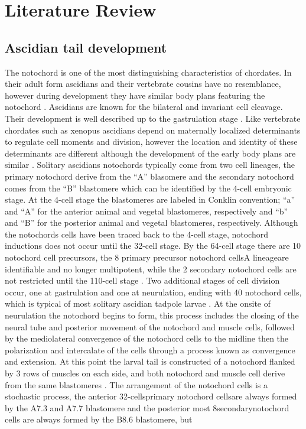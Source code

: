 \chapter{Literature Review}
\section{Ascidian tail development}

The notochord is one of the most distinguishing characteristics of chordates. In their adult form ascidians and their vertebrate cousins have no resemblance, however during development they have similar body plans featuring the notochord \cite{jeffery_minireview_2002}. Ascidians are known for the bilateral and invariant cell cleavage. Their development is well described up to the gastrulation stage \cite{nishida_cell_1983,nishida_cell_1985,nishida_cell_1987}. Like vertebrate chordates such as xenopus ascidians depend on maternally localized determinants to regulate cell moments and division, however the location and identity of these determinants are different although the development of the early body plans are similar \cite{lemaire_ascidians_2008}. Solitary ascidians notochords typically come from two cell lineages, the primary notochord derive from the ``A'' blasomere and the secondary notochord comes from the ``B'' blastomere \cite{nishida_cell_1983} which can be identified by the 4-cell embryonic stage. At the 4-cell stage the blastomeres are labeled in Conklin \cite{conklin_organization_1905} convention; ``a'' and ``A'' for the anterior animal and vegetal blastomeres, respectively and ``b'' and ``B'' for the posterior animal and vegetal blastomeres, respectively. Although the notochords cells have been traced back to the 4-cell stage, notochord inductions does not occur until the 32-cell stage. By the 64-cell stage there are 10 notochord cell precursors, the 8 primary precursor notochord cells\textemdash A lineage\textemdash are identifiable and no longer multipotent, while the 2 secondary notochord cells are not restricted until the 110-cell stage \cite{nishida_cell_1985,yasuo_ascidian_1994,yasuo_conservation_1998,lemaire_unfolding_2009}. Two additional stages of cell division occur, one at gastrulation and one at neurulation, ending with 40 notochord cells, which is typical of most solitary ascidian tadpole larvae \cite{conklin_organization_1905}. At the onsite of neurulation the notochord begins to form, this process includes the closing of the neural tube and posterior movement of the notochord and muscle cells, followed by the mediolateral convergence of the notochord cells to the midline then the polarization and intercalate of the cells through a process known as convergence and extension\cite{swalla_mechanisms_1993}. At this point the larval tail is constructed of a notochord flanked by 3 rows of muscles on each side, and both notochord and muscle cell derive from the same blastomeres \cite{nishida_cell_1985}. The arrangement of the notochord cells is a stochastic process, the anterior 32-cells\textemdash primary notochord cells\textemdash are always formed by the A7.3 and A7.7 blastomere and the posterior most 8\textemdash secondary\textemdash notochord cells are always formed by the B8.6 blastomere, but 